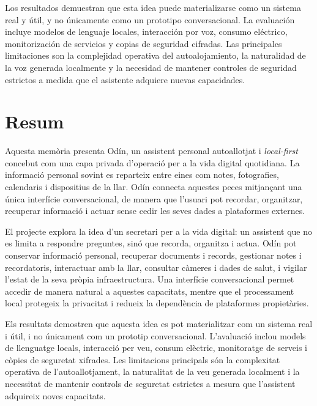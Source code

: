 Los resultados demuestran que esta idea puede materializarse como un sistema real y útil, y no únicamente como un prototipo conversacional. La evaluación incluye modelos de lenguaje locales, interacción por voz, consumo eléctrico, monitorización de servicios y copias de seguridad cifradas. Las principales limitaciones son la complejidad operativa del autoalojamiento, la naturalidad de la voz generada localmente y la necesidad de mantener controles de seguridad estrictos a medida que el asistente adquiere nuevas capacidades.

\chapter*{Resum}

Aquesta memòria presenta Odín, un assistent personal autoallotjat i \textit{local-first} concebut com una capa privada d'operació per a la vida digital quotidiana. La informació personal sovint es reparteix entre eines com notes, fotografies, calendaris i dispositius de la llar. Odín connecta aquestes peces mitjançant una única interfície conversacional, de manera que l'usuari pot recordar, organitzar, recuperar informació i actuar sense cedir les seves dades a plataformes externes.

El projecte explora la idea d'un secretari per a la vida digital: un assistent que no es limita a respondre preguntes, sinó que recorda, organitza i actua. Odín pot conservar informació personal, recuperar documents i records, gestionar notes i recordatoris, interactuar amb la llar, consultar càmeres i dades de salut, i vigilar l'estat de la seva pròpia infraestructura. Una interfície conversacional permet accedir de manera natural a aquestes capacitats, mentre que el processament local protegeix la privacitat i redueix la dependència de plataformes propietàries.

Els resultats demostren que aquesta idea es pot materialitzar com un sistema real i útil, i no únicament com un prototip conversacional. L'avaluació inclou models de llenguatge locals, interacció per veu, consum elèctric, monitoratge de serveis i còpies de seguretat xifrades. Les limitacions principals són la complexitat operativa de l'autoallotjament, la naturalitat de la veu generada localment i la necessitat de mantenir controls de seguretat estrictes a mesura que l'assistent adquireix noves capacitats.
